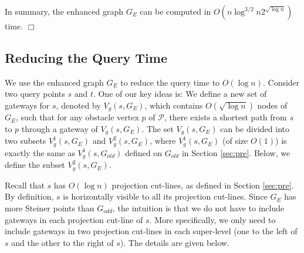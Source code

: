 \documentclass[english,runningheads,11pt]{llncs}
\def\calP{\mathcal{P}}
\newenvironment{proof}{\noindent {\textbf{Proof:}}\rm}{\hfill $\Box$\rm}
\begin{document}
\begin{proof}
In summary, the enhanced graph $G_E$ can be computed in
$O(n\log^{3/2}n2^{\sqrt{\log n}})$ time.
\end{proof}

\subsection{Reducing the Query Time}

We use the enhanced graph $G_E$ to reduce the query time to $O(\log n)$.
Consider two query points $s$ and $t$. One of our key ideas is: We
define a new set of gateways for $s$, denoted by $V_g(s,G_E)$, which
contains $O(\sqrt{\log n})$ nodes of $G_E$, such that
for any obstacle vertex $p$ of $\calP$, there
exists a shortest path from $s$ to $p$ through a gateway of
$V_g(s,G_E)$. The set $V_g(s,G_E)$ can be divided into two subsets $V^1_g(s,G_E)$ and
$V^2_g(s,G_E)$, where $V^1_g(s,G_E)$ (of size $O(1)$) is exactly the same as
$V^1_g(s,G_{old})$ defined on $G_{old}$ in Section \ref{sec:pre}. Below,
we define the subset $V^2_g(s,G_E)$.

Recall that $s$ has $O(\log n)$ projection cut-lines, as defined in
Section \ref{sec:pre}. By definition, $s$ is horizontally visible to all its
projection cut-lines. Since $G_E$ has more Steiner points than $G_{odd}$, the intuition is that we do not have to include gateways in each projection cut-line of $s$. More specifically, we only need to include gateways in two projection cut-lines in each super-level (one to the left of $s$ and the other to the right of $s$). The details are given below.
\end{document}
